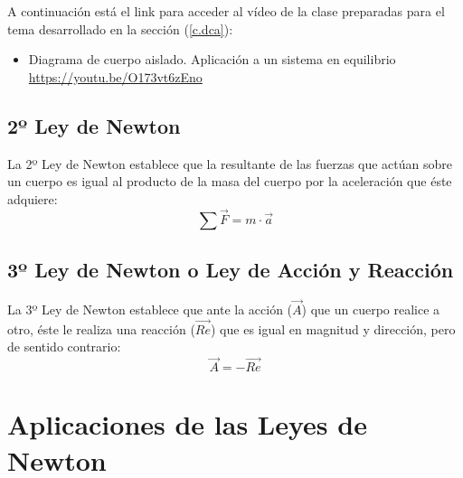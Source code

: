 A continuación está el link para acceder al vídeo de la clase preparadas para el
tema desarrollado en la sección (\ref{c.dca}):

\begin{itemize}
  \item Diagrama de cuerpo aislado. Aplicación a un sistema en equilibrio \\
    \href{https://youtu.be/O173vt6zEno}{https://youtu.be/O173vt6zEno}
\end{itemize}


\subsection{2º Ley de Newton}
\label{c.2ln}

\begin{tcolorbox}[colback=black!5!white,colframe=red!35!black]
La 2º Ley de Newton establece que la resultante de las fuerzas que actúan sobre
un cuerpo es igual al producto de la masa del cuerpo por la aceleración que éste
adquiere: 
$$
\sum\vec{F} = m\cdot \vec{a}
$$
\end{tcolorbox}



\subsection{3º Ley de Newton o Ley de Acción y Reacción}
\label{c.3ln}

\begin{tcolorbox}[colback=black!5!white,colframe=red!35!black]
La 3º Ley de Newton establece que ante la acción ($\vec{A}$) que un cuerpo
realice a otro, éste le realiza una reacción ($\vec{Re}$) que es igual en
magnitud y dirección, pero de sentido contrario:
$$
\vec{A} = -\vec{Re}
$$
\end{tcolorbox}




\section{Aplicaciones de las Leyes de Newton}

